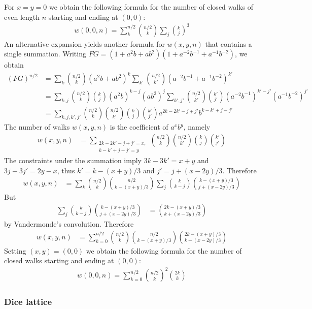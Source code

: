 \documentclass[12pt]{article}
\begin{document}
For $x = y = 0$ we obtain the following formula for the number of closed walks of even length $n$ starting and ending at $(0,0)$:
\begin{align*}
  w(0,0,n) = \sum_k^{n/2} \binom{n/2}{k}\sum_j\binom{k}{j}^3
\end{align*}
An alternative expansion yields another formula for $w(x,y,n)$ that contains a single summation. Writing $FG = (1 + a^2b + ab^2)(1 + a^{-2}b^{-1} + a^{-1}b^{-2})$, we obtain
\begin{align*}
(FG)^{n/2} &= \sum_k \binom{n/2}{k}(a^2b+ab^2)^k \sum_{k'}\binom{n/2}{k'}(a^{-2}b^{-1} + a^{-1}b^{-2})^{k'} \\
  &= \sum_{k,j}\binom{n/2}{k}\binom{k}{j} (a^2b)^{k-j}(ab^2)^j\sum_{k',j'}\binom{n/2}{k'}\binom{k'}{j'}(a^{-2}b^{-1})^{k'-j'}(a^{-1}b^{-2})^{j'}\\
 &= \sum_{k,j,k',j'} \binom{n/2}{k}\binom{n/2}{k'}\binom{k}{j}\binom{k'}{j'}a^{2k-2k'-j+j'}b^{k-k'+j-j'}
\end{align*}
The number of walks $w(x,y,n)$ is the coefficient of $a^xb^y$, namely
\begin{align*}
 w(x,y,n) &= \sum_{\substack{2k-2k'-j+j'=x,\\k-k'+j-j'=y}}\binom{n/2}{k}\binom{n/2}{k'}\binom{k}{j}\binom{k'}{j'}
\end{align*}
The constraints under the summation imply $3k - 3k' = x + y$ and $3j-3j' = 2y - x$, thus $k'= k - (x+y)/3$ and $j' = j + (x-2y)/3$.  Therefore
\begin{align*}
w(x,y,n) &= \sum_k\binom{n/2}{k}\binom{n/2}{k-(x+y)/3}\sum_j\binom{k}{k-j}\binom{k-(x+y)/3}{j+(x-2y)/3}
\end{align*}
But
\begin{align*}
\sum_j\binom{k}{k-j}\binom{k-(x+y)/3}{j+(x-2y)/3} &= \binom{2k-(x+y)/3}{k+(x-2y)/3}
\end{align*}
by Vandermonde's convolution.  Therefore
\begin{align*}
w(x,y,n) &= \sum_{k=0}^{n/2}\binom{n/2}{k}\binom{n/2}{k-(x+y)/3}\binom{2k-(x+y)/3}{k+(x-2y)/3}
\end{align*}
Setting $(x,y) = (0,0)$ we obtain the following formula for the number of closed walks starting and ending at $(0,0)$:
\begin{align*}
  w(0,0,n) = \sum_{k=0}^{n/2}\binom{n/2}{k}^2\binom{2k}{k}
\end{align*}

\subsubsection*{Dice lattice}
\end{document}
